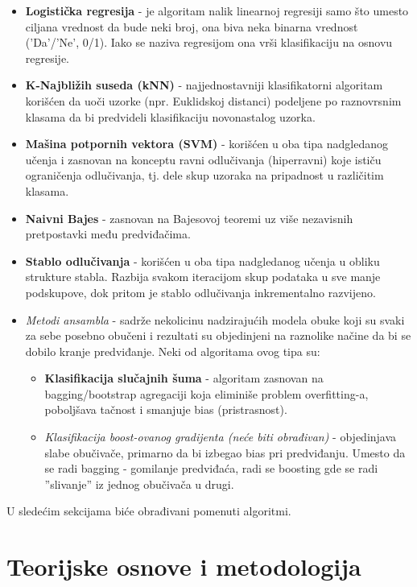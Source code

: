 \documentclass[fontsize=12bp, paper=a4]{scrarticle}
\begin{document}
\begin{itemize}
    \item \textbf{Logistička regresija} - je algoritam nalik linearnoj regresiji samo što umesto ciljana vrednost da bude neki broj, ona biva neka binarna vrednost ('Da'/'Ne', 0/1). Iako se naziva regresijom ona vrši klasifikaciju na osnovu regresije.
    \item \textbf{K-Najbližih suseda (kNN)} - najjednostavniji klasifikatorni algoritam korišćen da uoči uzorke (npr. Euklidskoj distanci) podeljene po raznovrsnim klasama da bi predvideli klasifikaciju novonastalog uzorka.
    \item \textbf{Mašina potpornih vektora (SVM)} - korišćen u oba tipa nadgledanog učenja i zasnovan na konceptu ravni odlučivanja (hiperravni) koje ističu ograničenja odlučivanja, tj. dele skup uzoraka na pripadnost u različitim klasama. 
    \item \textbf{Naivni Bajes} - zasnovan na Bajesovoj teoremi uz više nezavisnih pretpostavki među predviđačima.
    \item \textbf{Stablo odlučivanja} -  korišćen u oba tipa nadgledanog učenja u obliku strukture stabla. Razbija svakom iteracijom skup podataka u sve manje podskupove, dok pritom je stablo odlučivanja inkrementalno razvijeno. 
    \item \textit{Metodi ansambla} - sadrže nekolicinu nadzirajućih modela obuke koji su svaki za sebe posebno obučeni i rezultati su objedinjeni na raznolike načine da bi se dobilo kranje predviđanje. Neki od algoritama ovog tipa su:
    \begin{itemize}
        \item \textbf{Klasifikacija slučajnih šuma} - algoritam zasnovan na bagging/bootstrap agregaciji koja eliminiše problem overfitting-a, poboljšava tačnost i smanjuje bias (pristrasnost).
        \item \textit{Klasifikacija boost-ovanog gradijenta (neće biti obrađivan)} - objedinjava slabe obučivače, primarno da bi izbegao bias pri predviđanju. Umesto da se radi bagging - gomilanje predviđaća, radi se boosting gde se radi ''slivanje'' iz jednog obučivača u drugi.
    \end{itemize}
\end{itemize}
U sledećim sekcijama biće obrađivani pomenuti algoritmi.
\newpage

\section{Teorijske osnove i metodologija}
\end{document}
